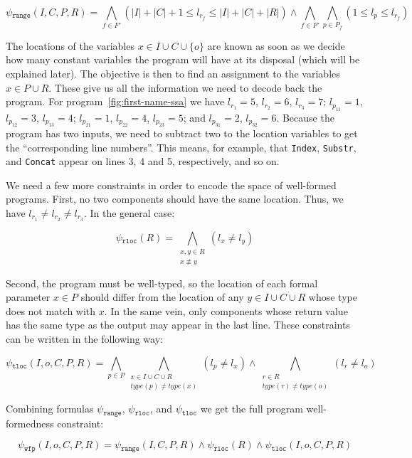 \[
  \psi{}_{\mathtt{range}}(I, C, P, R) =
  \bigwedge_{f \in F'} (|I| + |C| + 1 \leq l_{r_f} \leq |I| + |C| + |R|)
  \wedge \bigwedge_{f \in F'}\bigwedge_{p \in P_f} (1 \leq l_p \leq l_{r_f})
\]

The locations of the variables $x \in I \cup C \cup \{o\}$ are known as soon as
we decide how many constant variables the program will have at its disposal
(which will be explained later). The objective is then to find an assignment to
the variables $x \in P \cup R$. These give us all the information we need to
decode back the program. For program~\ref{fig:first-name-ssa} we have $l_{r_1} =
5$, $l_{r_2} = 6$, $l_{r_3} = 7$; $l_{p_{11}} = 1$, $l_{p_{12}} = 3$,
$l_{p_{13}} = 4$; $l_{p_{21}} = 1$, $l_{p_{22}} = 4$, $l_{p_{23}} = 5$; and
$l_{p_{31}} = 2$, $l_{p_{32}} = 6$. Because the program has two inputs, we need
to subtract two to the location variables to get the ``corresponding line
numbers''. This means, for example, that \lstinline{Index}, \lstinline{Substr},
and \lstinline{Concat} appear on lines 3, 4 and 5, respectively, and so on.

We need a few more constraints in order to encode the space of well-formed
programs. First, no two components should have the same location. Thus,
we have $l_{r_1} \neq l_{r_2} \neq l_{r_3}$. In the general case:

\[
  \psi{}_{\mathtt{rloc}}(R) =
  \bigwedge_{\substack{x, y \in R\\ x \not\equiv y}} (l_{x} \neq l_{y}) 
\]

\noindent
Second, the program must be well-typed, so the location of each formal parameter
$x \in P$ should differ from the location of any $y \in I \cup C \cup R$ whose
type does not match with $x$. In the same vein, only components whose return
value has the same type as the output may appear in the last line. These
constraints can be written in the following way:

\[
  \psi{}_{\mathtt{tloc}}(I, o, C, P, R) =
  \bigwedge_{p \in P}\bigwedge_{\substack{x \in I \cup C \cup R \\ type(p) \neq type(x)}} (l_p \neq l_x)
  \wedge \bigwedge_{\substack{r \in R \\ type(r) \neq type(o)}} (l_r \neq l_o)
\]

Combining formulas $\psi{}_{\mathtt{range}}$, $\psi{}_{\mathtt{rloc}}$, and
$\psi{}_{\mathtt{tloc}}$ we get the full program well-formedness constraint:

\[
  \psi{}_{\mathtt{wfp}}(I, o, C, P, R) =
  \psi{}_{\mathtt{range}}(I, C, P, R)
  \wedge \psi{}_{\mathtt{rloc}}(R)
  \wedge \psi{}_{\mathtt{tloc}}(I, o, C, P, R)
\]


